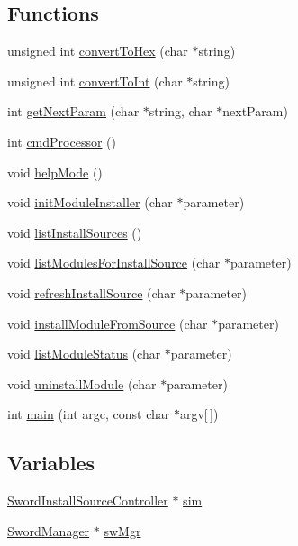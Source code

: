 \subsection*{Functions}
\begin{DoxyCompactItemize}
\item 
unsigned int \hyperlink{_installer_console_8mm_a296ce0a775d20e682c27b69e6f81d8c2}{convert\-To\-Hex} (char $\ast$string)
\item 
unsigned int \hyperlink{_installer_console_8mm_a16a1b9ddccc6c5e276793e11a2ab935b}{convert\-To\-Int} (char $\ast$string)
\item 
int \hyperlink{_installer_console_8mm_af65a5ae025f2abe01b412bde2530cac0}{get\-Next\-Param} (char $\ast$string, char $\ast$next\-Param)
\item 
int \hyperlink{_installer_console_8mm_a67390f8ac0e687ac51f6573e6d6d50bb}{cmd\-Processor} ()
\item 
void \hyperlink{_installer_console_8mm_a11aac3e3ceb26f26f084ab59d8edd1c7}{help\-Mode} ()
\item 
void \hyperlink{_installer_console_8mm_aa91f57a31f4e148da335475826d3284d}{init\-Module\-Installer} (char $\ast$parameter)
\item 
void \hyperlink{_installer_console_8mm_a21d796658993213d85b425938fd17144}{list\-Install\-Sources} ()
\item 
void \hyperlink{_installer_console_8mm_a3f852e1f48e6d778583f892d321bdf0e}{list\-Modules\-For\-Install\-Source} (char $\ast$parameter)
\item 
void \hyperlink{_installer_console_8mm_a8010d3dd8e579abafa7ddae688300a40}{refresh\-Install\-Source} (char $\ast$parameter)
\item 
void \hyperlink{_installer_console_8mm_a2d753511e26f2313f8b5d3ce728f2a01}{install\-Module\-From\-Source} (char $\ast$parameter)
\item 
void \hyperlink{_installer_console_8mm_a384f1e0287326fae281d7c44f7c380b0}{list\-Module\-Status} (char $\ast$parameter)
\item 
void \hyperlink{_installer_console_8mm_af68f1b80aec9820daca63edc6c391452}{uninstall\-Module} (char $\ast$parameter)
\item 
int \hyperlink{_installer_console_8mm_ac0f2228420376f4db7e1274f2b41667c}{main} (int argc, const char $\ast$argv\mbox{[}$\,$\mbox{]})
\end{DoxyCompactItemize}
\subsection*{Variables}
\begin{DoxyCompactItemize}
\item 
\hyperlink{interface_sword_install_source_controller}{Sword\-Install\-Source\-Controller} $\ast$ \hyperlink{_installer_console_8mm_a458feba2289b733ac159f8541bdd2b44}{sim}
\item 
\hyperlink{interface_sword_manager}{Sword\-Manager} $\ast$ \hyperlink{_installer_console_8mm_a41efc4ed8ae2a8890c4ea4225f64de52}{sw\-Mgr}
\end{DoxyCompactItemize}


